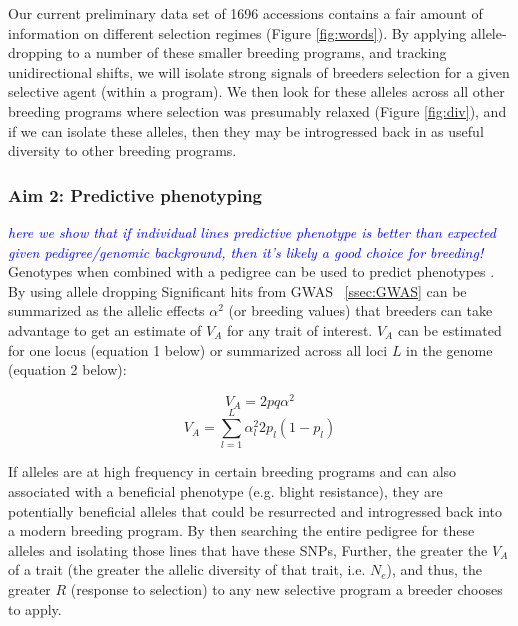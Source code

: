 \documentclass[draft,12pt]{article}
\newcommand{\jri}[1]{\textcolor{blue}{ \emph{\scriptsize  #1}} }
\begin{document}
Our current preliminary data set of 1696 accessions contains a fair amount of information on different selection regimes (Figure \ref{fig:words}). 
By applying allele-dropping to a number of these smaller breeding programs, and tracking unidirectional shifts, we will isolate strong signals of breeders selection for a given selective agent (within a program). 
We then look for these alleles across all other breeding programs where selection was presumably relaxed (Figure \ref{fig:div}), and if we can isolate these alleles, then they may be introgressed back in as useful diversity to other breeding programs.


\subsubsection*{Aim 2: Predictive phenotyping}
\jri{here we show that if individual lines predictive phenotype is better than expected given pedigree/genomic background, then it's likely a good choice for breeding! }
Genotypes when combined with a pedigree can be used to predict phenotypes \citep{de2009predicting,crossa2010prediction,Decker:2012kd}.  
By using allele dropping
Significant hits from GWAS ~\ref{ssec:GWAS} can be summarized as the allelic effects $\alpha^{2}$ (or breeding values) that breeders can take advantage to get an estimate of $V_{A}$ for any trait of interest. $V_{A}$ can be estimated for one locus (equation 1 below) or summarized across all loci $L$ in the genome (equation 2 below):
\begin{multicols}{2}
  \begin{equation}
    V_A = 2pq\alpha^2
  \end{equation}\break
  \begin{equation}
    V_A = \overset{L}{\underset{l=1}{\sum}}\alpha^2_l2p_l(1-p_l)
  \end{equation}
\end{multicols}
If alleles are at high frequency in certain breeding programs and can also associated with a beneficial phenotype (e.g. blight resistance), they are potentially beneficial alleles that could be resurrected and introgressed back into a modern breeding program. 
By then searching the entire pedigree for these alleles and isolating those lines that have these SNPs, 
Further, the greater the $V_A$ of a trait (the greater the allelic diversity of that trait, i.e. $N_{e}$), and thus, the greater $R$ (response to selection) to any new selective program a breeder chooses to apply.
\end{document}
